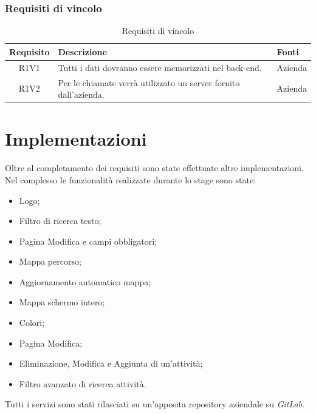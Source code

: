 \subsubsection{Requisiti di vincolo}

\begin{center}
	\begin{table}[h!]
		
		\label{tab:Requisiti di vincolo}
		\begin{tabularx}{\textwidth}{|c|p{8cm}|p{2.1cm}|}
			
			\hline
			\textbf{Requisito} & \centering\textbf{Descrizione} & \textbf{Fonti}  \\\hline
			
				R1V1 & Tutti i dati dovranno essere memorizzati nel back-end.  & Azienda\\
				\hline
				R1V2 & Per le chiamate verrà utilizzato un server fornito dall'azienda.  & Azienda\\
			\hline		
		\end{tabularx}
		\vspace{0.3cm}
		\caption{Requisiti di vincolo}
	\end{table}
\end{center}


\newpage

\section{Implementazioni}
Oltre al completamento dei requisiti sono state effettuate altre implementazioni.\\
Nel complesso le funzionalità realizzate durante lo stage sono state: 
\begin{itemize}
	\item Logo;
	\item Filtro di ricerca testo;
	\item Pagina Modifica e campi obbligatori;
	\item Mappa percorso;
	\item Aggiornamento automatico mappa;
	\item Mappa schermo intero;
	\item Colori;
	\item Pagina Modifica;
	\item Eliminazione, Modifica e Aggiunta di un'attività;
	\item Filtro avanzato di ricerca attività.
\end{itemize}
Tutti i servizi sono stati rilasciati su un'apposita repository aziendale su \textit{GitLab}.

